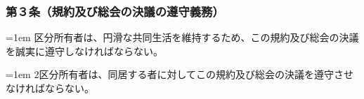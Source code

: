 \documentclass[
  luatex,
  paper=a4paper,
  fontsize=11pt,
  jafontsize=11pt,
  jlreq_notes,
]{jlreq}
\newcommand{\joumain}[1]{%
  \noindent\hangindent=1em\hangafter=1
  \hspace{1em}#1%
}
\newcommand{\kou}[2]{%
  \par\noindent\hangindent=1em\hangafter=1
  #1\hspace{1em}#2%
}
\def\toKansuji#1{
  \tempvls=#1
  \ifcase\tempvls
    \or 一　\or 二　\or 三　\or 四　\or 五　\or 六　\or 七　\or 八　\or 九　\or 十　
    \or 十一　\or 十二　\or 十三　\or 十四　\or 十五　\or 十六　\or 十七　\or 十八　\or 十九　
  \else 未定義
  \fi
}
\begin{document}
  
  \subsubsection*{第３条（規約及び総会の決議の遵守義務）}
  \joumain{区分所有者は、円滑な共同生活を維持するため、この規約及び総会の決議を誠実に遵守しなければならない。}
  \kou{2}{区分所有者は、同居する者に対してこの規約及び総会の決議を遵守させなければならない。}
\end{document}
